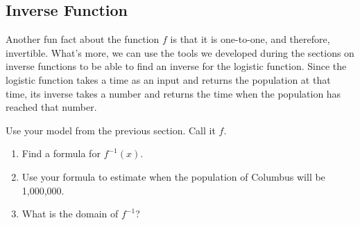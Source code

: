 \documentclass{ximera}
\begin{document}
\subsection{Inverse Function}
Another fun fact about the function $f$ is that it is one-to-one, and therefore, invertible. What's more, we can use the tools we developed during the sections on inverse functions to be able to find an inverse for the logistic function. Since the logistic function takes a time as an input and returns the population at that time, its inverse takes a number and returns the time when the population has reached that number. 

\begin{exploration}
Use your model from the previous section. Call it $f$. 
\begin{enumerate}[label=\alph*.]
\item Find a formula for $f^{-1}(x)$.

\item Use your formula to estimate when the population of Columbus will be 1,000,000.

\item What is the domain of $f^{-1}$?
\end{enumerate}
\end{exploration}
\end{document}
